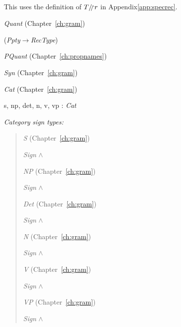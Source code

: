 This uses the definition of $T\drestr r$ in
Appendix\ref{app:specrec}. %

\textit{Quant} (Chapter~\ref{ch:gram})

(\textit{Ppty}$\rightarrow$\textit{RecType})

\textit{PQuant} (Chapter~\ref{ch:propnames})



\textit{Syn} (Chapter~\ref{ch:gram})


\textit{Cat} (Chapter~\ref{ch:gram})

s, np, det, n, v, vp : \textit{Cat}

\textit{Category sign types:}

\begin{quote}
\textit{S} (Chapter~\ref{ch:gram})

\textit{Sign} \d{$\wedge$}

\textit{NP} (Chapter~\ref{ch:gram})

\textit{Sign} \d{$\wedge$}

\textit{Det} (Chapter~\ref{ch:gram})

\textit{Sign} \d{$\wedge$}

\textit{N} (Chapter~\ref{ch:gram})

\textit{Sign} \d{$\wedge$}

\textit{V} (Chapter~\ref{ch:gram})

\textit{Sign} \d{$\wedge$}

\textit{VP} (Chapter~\ref{ch:gram})

\textit{Sign} \d{$\wedge$}

\end{quote}

